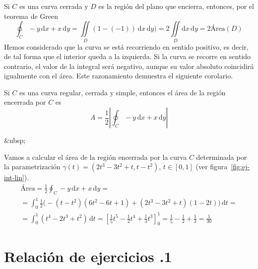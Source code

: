Si $C$ es una curva cerrada y $D$ es la región del plano que encierra, entonces, por el teorema de Green
\[
\oint_{C} -y\,\mathrm dx + x\,\mathrm dy = \iint\limits_{\mathit D} (1-(-1))\,\mathrm dx\,\mathrm dy )= 
2\iint\limits_{\mathit D} \mathrm dx\,\mathrm dy = 2\text{Área}(D)
\]
Hemos considerado que la curva se está recorriendo en sentido positivo, es decir, de tal forma que el interior queda a la izquierda.
Si la curva se recorre en sentido contrario, el valor de la integral será negativo, aunque su valor absoluto coincidirá igualmente con el área.
Este razonamiento demuestra el siguiente corolario.

\begin{corolario}\label{cor:areacurva}
Si $C$ es una curva regular, cerrada y simple, entonces el área de la región encerrada por $C$ es
\[
A= \frac12\left|\oint_C -y\,\mathrm dx+x\,\mathrm dy\right|
\]
\end{corolario}
\begin{rawhtml}
&nbsp;
\end{rawhtml}
\begin{ejemplo}\label{ej:area-green}
Vamos a calcular el área de la región  encerrada por la curva $C$ determinada por la parametrización $\gamma(t)=(2t^3-3t^2+t,t-t^2)$, $t\in[0,1]$ (ver figura~\ref{fig:ej-int-lin}).
\begin{multline*}
\text{Área}=\frac12\oint_{C} -y\,\mathrm dx+x\,\mathrm dy =\\
= \int_0^1 \frac12\big(-(t-t^2)(6t^2-6t+1)+(2t^3-3t^2+t)(1-2t)\big)\,\mathrm dt =\\
= \int_0^1 (t^4-2t^3+t^2)\,\mathrm dt 
= \left[\frac15t^5-\frac12t^4+\frac13t^3\right]_0^1=\frac15-\frac12+\frac13=\frac1{30}\tag*{\fej}
\end{multline*}
\end{ejemplo}


%    
%    

\newpage

\section*{Relación de ejercicios \thechapter.1}


